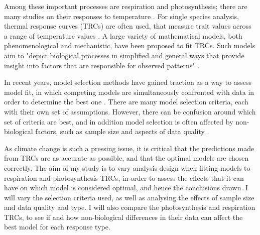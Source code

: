 \documentclass[11pt, a4paper]{article}
\begin{document}
Among these important processes are respiration and photosynthesis; there are many studies on their responses to temperature \cite{gutowMarineMesoherbivoreConsumption2016, sageTemperatureResponseC32007, caronEffectTemperatureGrowth1986, wittmannTemperatureDependencyBark2007, hanckeTemperatureEffectsMicroalgal2008}. For single species analysis, thermal response curves (TRCs) are often used, that measure trait values across a range of temperature values \cite{dellSystematicVariationTemperature2011}. A large variety of mathematical models, both phenomenological and mechanistic, have been proposed to fit TRCs. Such models aim to "depict biological processes in simplified and general ways that provide insight into factors that are responsible for observed patterns" \cite{johnsonModelSelectionEcology2004}.

In recent years, model selection methods have gained traction as a way to assess model fit, in which competing models are simultaneously confronted with data in order to determine the best one  \cite{johnsonModelSelectionEcology2004}. There are many model selection criteria, each with their own set of assumptions. However, there can be confusion around which set of criteria are best, and in addition model selection is often affected by non-biological factors, such as sample size and aspects of data quality \cite{burnhamModelSelectionMultimodel2002}.

As climate change is such a pressing issue, it is critical that the predictions made from TRCs are as accurate as possible, and that the optimal models are chosen correctly. The aim of my study is to vary analysis design when fitting models to respiration and photosynthesis TRCs, in order to assess the effects that it can have on which model is considered optimal, and hence the conclusions drawn. I will vary the selection criteria used, as well as analysing the effects of sample size and data quality and type. I will also compare the photosynthesis and respiration TRCs, to see if and how non-biological differences in their data can affect the best model for each response type.




\end{document}

